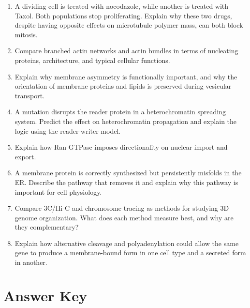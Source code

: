 \documentclass[12pt,fontset=none]{ctexart}
\begin{document}
\begin{enumerate}
\item A dividing cell is treated with nocodazole, while another is treated with Taxol. Both populations stop proliferating. Explain why these two drugs, despite having opposite effects on microtubule polymer mass, can both block mitosis.

\item Compare branched actin networks and actin bundles in terms of nucleating proteins, architecture, and typical cellular functions.

\item Explain why membrane asymmetry is functionally important, and why the orientation of membrane proteins and lipids is preserved during vesicular transport.

\item A mutation disrupts the reader protein in a heterochromatin spreading system. Predict the effect on heterochromatin propagation and explain the logic using the reader-writer model.

\item Explain how Ran GTPase imposes directionality on nuclear import and export.

\item A membrane protein is correctly synthesized but persistently misfolds in the ER. Describe the pathway that removes it and explain why this pathway is important for cell physiology.

\item Compare 3C/Hi-C and chromosome tracing as methods for studying 3D genome organization. What does each method measure best, and why are they complementary?

\item Explain how alternative cleavage and polyadenylation could allow the same gene to produce a membrane-bound form in one cell type and a secreted form in another.
\end{enumerate}

\newpage
\section*{Answer Key}
\end{document}
